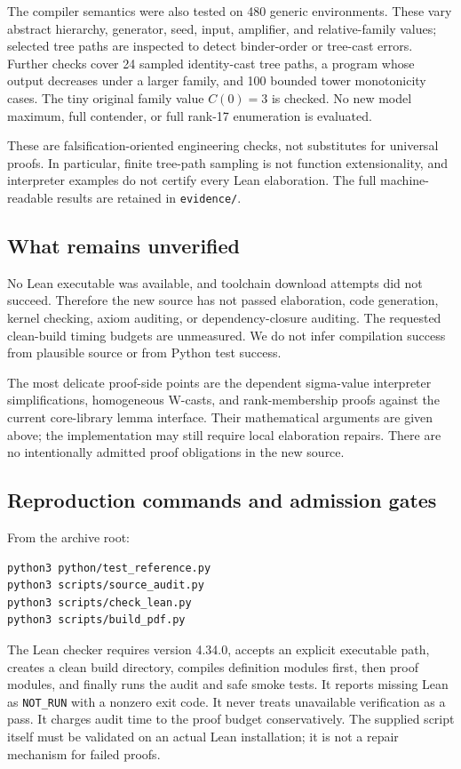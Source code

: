\documentclass[11pt,letterpaper]{article}
\theoremstyle{definition}
\newcommand{\code}[1]{\nolinkurl{#1}}
\begin{document}
The compiler semantics were also tested on 480 generic environments. These
vary abstract hierarchy, generator, seed, input, amplifier, and relative-family
values; selected tree paths are inspected to detect binder-order or tree-cast
errors. Further checks cover 24 sampled identity-cast tree paths, a program
whose output decreases under a larger family, and 100 bounded tower
monotonicity cases. The tiny original family value $C(0)=3$ is checked. No new
model maximum, full contender, or full rank-17 enumeration is evaluated.

These are falsification-oriented engineering checks, not substitutes for
universal proofs. In particular, finite tree-path sampling is not function
extensionality, and interpreter examples do not certify every Lean elaboration.
The full machine-readable results are retained in \code{evidence/}.

\subsection{What remains unverified}

No Lean executable was available, and toolchain download attempts did not
succeed. Therefore the new source has not passed elaboration, code generation,
kernel checking, axiom auditing, or dependency-closure auditing. The requested
clean-build timing budgets are unmeasured. We do not infer compilation success
from plausible source or from Python test success.

The most delicate proof-side points are the dependent sigma-value interpreter
simplifications, homogeneous W-casts, and rank-membership proofs against the
current core-library lemma interface. Their mathematical arguments are given
above; the implementation may still require local elaboration repairs. There
are no intentionally admitted proof obligations in the new source.

\subsection{Reproduction commands and admission gates}

From the archive root:
\begin{lstlisting}
python3 python/test_reference.py
python3 scripts/source_audit.py
python3 scripts/check_lean.py
python3 scripts/build_pdf.py
\end{lstlisting}
The Lean checker requires version 4.34.0, accepts an explicit executable path,
creates a clean build directory, compiles definition modules first, then proof
modules, and finally runs the audit and safe smoke tests. It reports missing
Lean as \code{NOT_RUN} with a nonzero exit code. It never treats unavailable
verification as a pass. It charges audit time to the proof budget
conservatively. The supplied script itself must be validated on an actual Lean
installation; it is not a repair mechanism for failed proofs.
\end{document}
